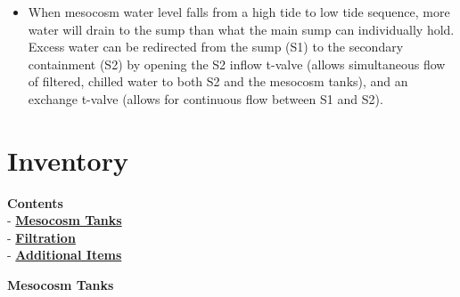 \documentclass[]{book}
\providecommand{\tightlist}{%
  \setlength{\itemsep}{0pt}\setlength{\parskip}{0pt}}
\begin{document}
\begin{itemize}
  \begin{itemize}
  \tightlist
  \item
    When mesocosm water level falls from a high tide to low tide
    sequence, more water will drain to the sump than what the main sump
    can individually hold. Excess water can be redirected from the sump
    (S1) to the secondary containment (S2) by opening the S2 inflow
    t-valve (allows simultaneous flow of filtered, chilled water to both
    S2 and the mesocosm tanks), and an exchange t-valve (allows for
    continuous flow between S1 and S2).
  \end{itemize}
\end{itemize}

\chapter{Inventory}\label{inventory}

\textbf{Contents}\\
- \protect\hyperlink{Mesocosm_Tanks}{\textbf{Mesocosm Tanks}}\\
- \protect\hyperlink{Filtration}{\textbf{Filtration}}\\
- \protect\hyperlink{Additional_Items}{\textbf{Additional Items}}

 \textbf{Mesocosm Tanks}
\end{document}
